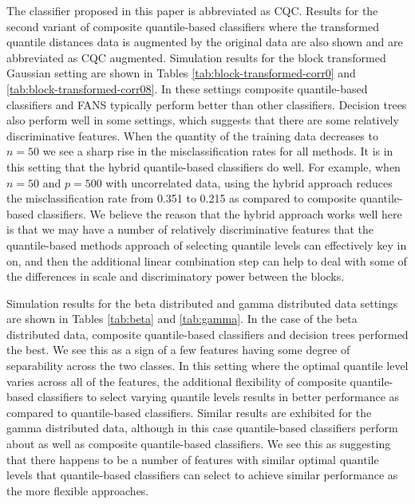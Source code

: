 The classifier proposed in this paper is abbreviated as CQC.  Results for the
second variant of composite quantile-based classifiers where the transformed
quantile distances data is augmented by the original data are also shown and are
abbreviated as CQC augmented.  Simulation results for the block transformed
Gaussian setting are shown in Tables \ref{tab:block-transformed-corr0} and
\ref{tab:block-transformed-corr08}.  In these settings composite quantile-based
classifiers and FANS typically perform better than other classifiers.  Decision
trees also perform well in some settings, which suggests that there are some
relatively discriminative features.  When the quantity of the training data
decreases to $n = 50$ we see a sharp rise in the misclassification rates for all
methods.  It is in this setting that the hybrid quantile-based classifiers do
well.  For example, when $n = 50$ and $p = 500$ with uncorrelated data, using
the hybrid approach reduces the misclassification rate from 0.351 to 0.215 as
compared to composite quantile-based classifiers.  We believe the reason that
the hybrid approach works well here is that we may have a number of relatively
discriminative features that the quantile-based methods approach of selecting
quantile levels can effectively key in on, and then the additional linear
combination step can help to deal with some of the differences in scale and
discriminatory power between the blocks.

Simulation results for the beta distributed and gamma distributed data settings
are shown in Tables \ref{tab:beta} and \ref{tab:gamma}.  In the case of the beta
distributed data, composite quantile-based classifiers and decision trees
performed the best.  We see this as a sign of a few features having some degree
of separability across the two classes.  In this setting where the optimal
quantile level varies across all of the features, the additional flexibility of
composite quantile-based classifiers to select varying quantile levels results
in better performance as compared to quantile-based classifiers.  Similar
results are exhibited for the gamma distributed data, although in this case
quantile-based classifiers perform about as well as composite quantile-based
classifiers.  We see this as suggesting that there happens to be a number of
features with similar optimal quantile levels that quantile-based classifiers
can select to achieve similar performance as the more flexible approaches.






